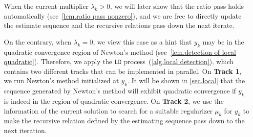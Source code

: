 \documentclass{article}
\begin{document}
\begin{algorithm}[!ht]
    \caption{Local Detection for \autoref{alg.accelerated utr} (LD)}\label{alg.local detection}
    \begin{algorithmic}[1]
        \ENDIF
        \ENDIF
        \ENDFOR
        \ELSE
        \ENDIF
        \STATE{$\mu_-=\mu$}
        \STATE{$\mu_+ = \mu$}
        \ELSE
        \ENDIF
        \ENDWHILE
    \end{algorithmic}
\end{algorithm}
When the current multiplier $\lambda_k>0$, we will later show that the ratio pass holds automatically (see~\autoref{lem.ratio pass nonzero}), and we are free to directly update the estimate sequence and the recursive relations pass down the next iterate.

On the contrary, when $\lambda_k=0$, we view this case as a hint that $y_k$ may be in the quadratic convergence region of Newton's method (see~\autoref{lem.detection of local quadratic}). Therefore, we apply the \texttt{LD} process~(\autoref{alg.local detection}), which contains two different tracks that can be implemented in parallel. On \textbf{Track 1}, we run Newton's method initialized at $y_k$. It will be shown in \autoref{sec.local} that the sequence generated by Newton's method will exhibit quadratic convergence if $y_k$ is indeed in the region of quadratic convergence. On \textbf{Track 2}, we use the information of the current solution to search for a suitable regularizer $\mu_k$ for $y_k$ to make the recursive relation defined by the estimating sequence pass down to the next iteration.
\end{document}
